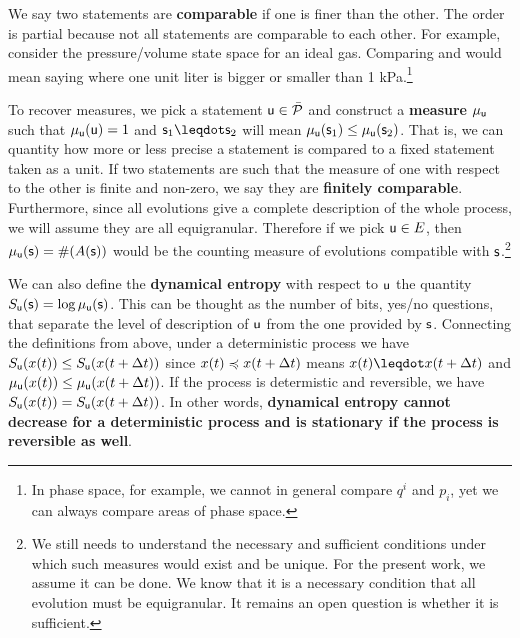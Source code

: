 \documentclass[letterpaper]{article}
\begin{document}
We say two statements are \textbf{comparable} if one is finer than the other. The order is partial because not all statements are comparable to each other. For example, consider the pressure/volume state space for an ideal gas. Comparing  and  would mean saying where one unit liter is bigger or smaller than 1 kPa.\footnote{In phase space, for example, we cannot in general compare $q^i$ and $p_i$, yet we can always compare areas of phase space.}

To recover measures, we pick a statement $\stmt[u] \in \tdomain[P]$ and construct a \textbf{measure} $\mu_{\stmt[u]}$ such that $\mu_{\stmt[u]}(\stmt[u]) = 1$ and $\stmt_1 \finer \stmt_2$ will mean $\mu_{\stmt[u]}(\stmt_1) \leq \mu_{\stmt[u]}(\stmt_2)$. That is, we can quantity how more or less precise a statement is compared to a fixed statement taken as a unit. If two statements are such that the measure of one with respect to the other is finite and non-zero, we say they are \textbf{finitely comparable}. Furthermore, since all evolutions give a complete description of the whole process, we will assume they are all equigranular. Therefore if we pick $\stmt[u] \in E$, then $\mu_{\stmt[u]}(\stmt)=\#(A(\stmt))$ would be the counting measure of evolutions compatible with $\stmt$.\footnote{We still needs to understand the necessary and sufficient conditions under which such measures would exist and be unique. For the present work, we assume it can be done. We know that it is a necessary condition that all evolution must be equigranular. It remains an open question is whether it is sufficient.}

We can also define the \textbf{dynamical entropy} with respect to $\stmt[u]$ the quantity $S_{\stmt[u]}(\stmt) = \log \mu_{\stmt[u]}(\stmt)$. This can be thought as the number of bits, yes/no questions, that separate the level of description of $\stmt[u]$ from the one provided by $\stmt$. Connecting the definitions from above, under a deterministic process we have $S_{\stmt[u]}(x(t)) \leq S_{\stmt[u]}(x(t + \Delta t))$ since $x(t)\narrower x(t+\Delta t)$ means $x(t) \finer x(t+\Delta t)$ and $\mu_{\stmt[u]}(x(t)) \leq \mu_{\stmt[u]}(x(t+\Delta t))$. If the process is determistic and reversible, we have $S_{\stmt[u]}(x(t)) = S_{\stmt[u]}(x(t + \Delta t))$. In other words, \textbf{dynamical entropy cannot decrease for a deterministic process and is stationary if the process is reversible as well}.
\end{document}
